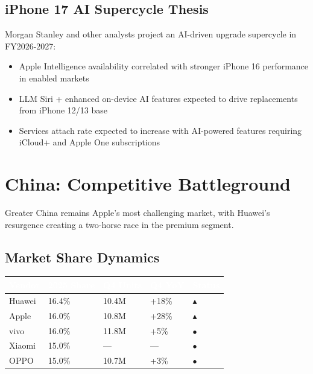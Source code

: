 \documentclass[11pt,a4paper]{article}
\newcommand{\kpiup}{\textcolor{msgreen}{$\blacktriangle$}}
\newcommand{\kpiflat}{\textcolor{msgray}{$\bullet$}}
\begin{document}
\subsection{iPhone 17 AI Supercycle Thesis}

Morgan Stanley and other analysts project an AI-driven upgrade supercycle in FY2026-2027:

\begin{itemize}
    \item Apple Intelligence availability correlated with stronger iPhone 16 performance in enabled markets
    \item LLM Siri + enhanced on-device AI features expected to drive replacements from iPhone 12/13 base
    \item Services attach rate expected to increase with AI-powered features requiring iCloud+ and Apple One subscriptions
\end{itemize}

\section{China: Competitive Battleground}

Greater China remains Apple's most challenging market, with Huawei's resurgence creating a two-horse race in the premium segment.

\subsection{Market Share Dynamics}

\begin{center}
\begin{tabular}{L{3cm}R{2cm}R{2cm}R{2cm}C{2cm}}
\toprule
{}
\textcolor{white}{\textbf{Vendor}} & \textcolor{white}{\textbf{2025 Share}} & \textcolor{white}{\textbf{Q4 Units}} & \textcolor{white}{\textbf{Q4 YoY}} & \textcolor{white}{\textbf{Status}} \\
\midrule
Huawei & 16.4\% & 10.4M & +18\% & \kpiup \\
Apple & 16.0\% & 10.8M & +28\% & \kpiup \\
vivo & 16.0\% & 11.8M & +5\% & \kpiflat \\
Xiaomi & 15.0\% & --- & --- & \kpiflat \\
OPPO & 15.0\% & 10.7M & +3\% & \kpiflat \\
\bottomrule
\end{tabular}
\end{center}
\end{document}
